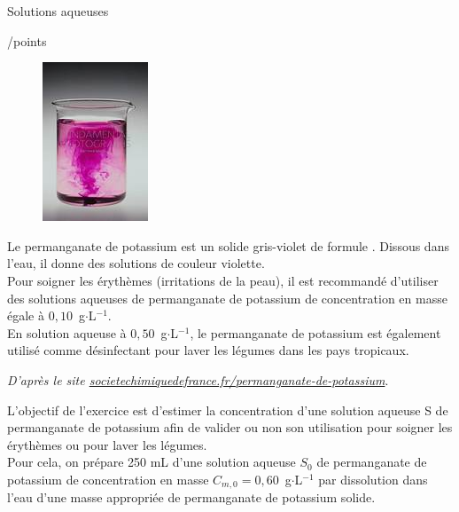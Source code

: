 \newpage

\begin{doc}{Solutions aqueuses \begin{Large}
    /points
\end{Large}}
\begin{figure}
\vspace{-1cm}
    \centering
      \includegraphics[scale=1.0]{Images/DS/Devoir_Commun/Permanganate.png}
  \end{figure}
\og Le permanganate de potassium est un solide gris-violet de formule . Dissous dans l’eau, il donne des solutions de couleur violette.\\
Pour soigner les érythèmes (irritations de la peau), il est recommandé d’utiliser des solutions aqueuses de permanganate de potassium de concentration en masse égale à $0,10$~g$\cdot$L$^{-1}$.\\
En solution aqueuse à $0,50$~g$\cdot$L$^{-1}$, le permanganate de potassium est également utilisé comme désinfectant pour laver les légumes dans les pays tropicaux.\fg
\begin{flushright}
    \textit{D’après le site \url{ societechimiquedefrance.fr/permanganate-de-potassium}}.
\end{flushright}

L’objectif de l’exercice est d’estimer la concentration d’une solution aqueuse S de permanganate de potassium afin de valider ou non son utilisation pour soigner les érythèmes ou pour laver les légumes.\\

Pour cela, on prépare 250 mL d’une solution aqueuse $S_0$ de permanganate de potassium de concentration en masse $C_{m,0} = 0,60$~g$\cdot$L$^{-1}$ par dissolution dans l’eau d’une masse appropriée de permanganate de potassium solide.\\



\end{doc}
